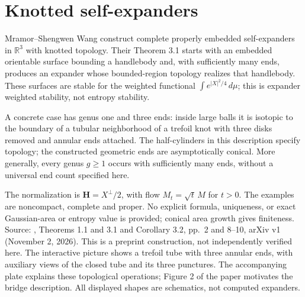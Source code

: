 \chapter{Knotted self-expanders}\label{sec:catalogue-knotted-expanders}
\begin{example}\label{ex:catalogue-knotted-expanders}
Mramor--Shengwen Wang construct complete properly embedded self-expanders in $\mathbb R^3$ with knotted topology. Their Theorem 3.1 starts with an embedded orientable surface bounding a handlebody and, with sufficiently many ends, produces an expander whose bounded-region topology realizes that handlebody. These surfaces are stable for the weighted functional $\int e^{|X|^2/4}\,d\mu$; this is expander weighted stability, not entropy stability.

A concrete case has genus one and three ends: inside large balls it is isotopic to the boundary of a tubular neighborhood of a trefoil knot with three disks removed and annular ends attached. The half-cylinders in this description specify topology; the constructed geometric ends are asymptotically conical. More generally, every genus $g\geq1$ occurs with sufficiently many ends, without a universal end count specified here.

The normalization is $\mathbf H=X^\perp/2$, with flow $M_t=\sqrt t\,M$ for $t>0$. The examples are noncompact, complete and proper. No explicit formula, uniqueness, or exact Gaussian-area or entropy value is provided; conical area growth gives finiteness. Source: \cite{CatMWKnotted26}, Theorems 1.1 and 3.1 and Corollary 3.2, pp.~2 and 8--10, arXiv v1 (November 2, 2026). This is a preprint construction, not independently verified here. The interactive picture shows a trefoil tube with three annular ends, with auxiliary views of the closed tube and its three punctures. The accompanying plate explains these topological operations; Figure 2 of the paper motivates the bridge description. All displayed shapes are schematics, not computed expanders.
\end{example}

